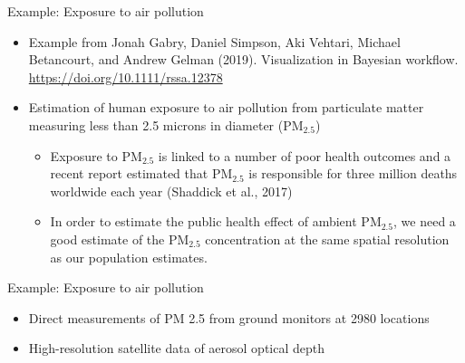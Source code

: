 \documentclass[t]{beamer}
\begin{document}
\begin{frame}

  {\Large\color{navyblue} Example: Exposure to air pollution}

  \begin{itemize}
  \item Example from Jonah Gabry, Daniel Simpson, Aki Vehtari, Michael
    Betancourt, and Andrew Gelman (2019). Visualization in Bayesian
    workflow. \url{https://doi.org/10.1111/rssa.12378}
  \item Estimation of human exposure to air pollution from particulate
    matter measuring less than 2.5 microns in diameter ($\mathrm{PM}_{2.5}$)
    \begin{itemize}
    \item Exposure to $\mathrm{PM}_{2.5}$ is linked to a number of
      poor health outcomes and a recent report estimated that
      $\mathrm{PM}_{2.5}$ is responsible for three million deaths
      worldwide each year (Shaddick et al., 2017)
    \item In order to estimate the public health effect of ambient
      $\mathrm{PM}_{2.5}$, we need a good estimate of the
      $\mathrm{PM}_{2.5}$ concentration at the same spatial resolution
      as our population estimates.
    \end{itemize}
\end{itemize}

\end{frame}

\begin{frame}

  {\Large\color{navyblue} Example: Exposure to air pollution}

  \begin{itemize}
  \item Direct measurements of PM 2.5 from ground monitors at 2980
    locations
  \item High-resolution satellite data of aerosol optical depth
    
  \end{itemize}
  \begin{center}
\end{center}
\end{frame}
\end{document}
